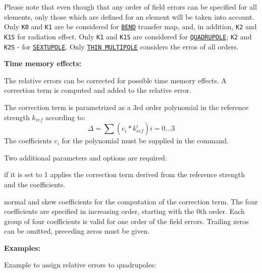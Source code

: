  Please note that even though that any order of field errors can be specified 
 for all elements, only those which are defined for an element will be taken into account.
 Only \texttt{K0} and  \texttt{K1} are be considered for  \hyperref[sec:bend]{\texttt{BEND}} 
 transfer map, and, in addition, \texttt{K2} and \texttt{K1S} for radiation effect. Only 
 \texttt{K1} and \texttt{K1S} are considered for  \hyperref[sec:quadrupole]{\texttt{QUADRUPOLE}}; 
 \texttt{K2}  and \texttt{K2S} - for \hyperref[sec:sextupole]{\texttt{SEXTUPOLE}}. Only 
 \hyperref[sec:multipole]{\texttt{THIN MULTIPOLE}} considers the erros of all orders. 
 
\textbf{Time memory effects:}

The relative errors can be corrected for possible time memory effects. A
correction term is computed and added to the relative error. 

The correction term is parametrized as a 3rd order polynomial in the
reference strength $k_{ref}$ according to:  
\[ \Delta = \sum (c_i * {\mathit k}^{i}_{ref})            i = 0...3\]
The coefficients $c_i$ for the polynomial must be supplied in the
command.  

Two additional parameters and options are required: 
\begin{madlist}
   if it is set to 1 applies the correction term derived from the
  reference strength and the coefficients.  

   normal and skew coefficients for the computation
  of the correction term. The four coefficients are specified in increasing
  order, starting with the 0th order. Each group of four coefficients is
  valid for one order of the field errors. Trailing zeros can be omitted,
  preceding zeros must be given.  
\end{madlist}

\textbf{Examples:}

Example to assign relative errors to quadrupoles: 


